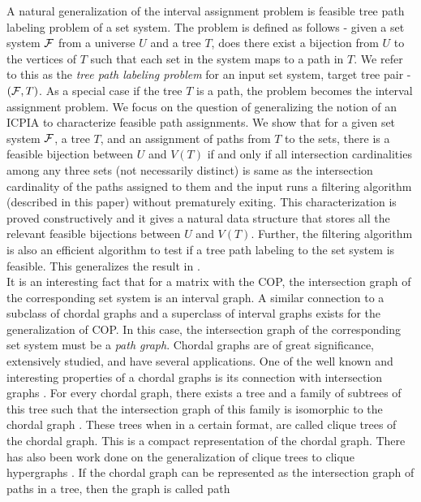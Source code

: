 \documentclass[11pt,letter]{../lib/llncs}
\def\cF{{\cal F}}
\def\xnoindent{\noindent} %
\begin{document}
  A natural generalization of the interval
assignment problem is feasible tree path labeling problem of a set
system. The problem is defined as follows - given a set system $\cF$
from a universe $U$ and a tree $T$, does there exist a bijection from
$U$ to the vertices of $T$ such that each set in the system maps to a
path in $T$.  We refer to this as the {\em tree path labeling problem}
for an input set system, target tree pair - $(\cF,T)$. As a special
case if the tree $T$ is a path, the problem becomes the interval
assignment problem.  We focus on the question of generalizing the
notion of an ICPIA \cite{nsnrs09} to characterize feasible path
assignments.  We show that for a given set system $\cF$, a tree $T$,
and an assignment of paths from $T$ to the sets, there is a feasible
bijection between $U$ and $V(T)$ if and only if all intersection
cardinalities among any three sets (not necessarily distinct) is same
as the intersection cardinality of the paths assigned to them and the
input runs a filtering algorithm (described in this paper) without
prematurely exiting.  This characterization is proved constructively
and it gives a natural data structure that stores all the relevant
feasible bijections between $U$ and $V(T)$.  Further, the filtering
algorithm is also an efficient algorithm to test if a tree path
labeling to the set system is feasible.  This
generalizes the result in \cite{nsnrs09}.\\
\xnoindent It is an interesting fact that for a matrix with the COP,
the intersection graph of the corresponding set system is an interval
graph.  A similar connection to a subclass of chordal graphs and a
superclass of interval graphs exists for the generalization of COP.
In this case, the intersection graph of the corresponding set system
must be a {\em path graph}. Chordal graphs are of great significance,
extensively studied, and have several applications.  One of the well
known and interesting properties of a chordal graphs is its connection
with intersection graphs \cite{mcg04}. For every chordal graph, there
exists a tree and a family of subtrees of this tree such that the
intersection graph of this family is isomorphic to the chordal graph
\cite{plr70,gav78,bp93}.  These trees when in a certain format, are
called clique trees \cite{apy92} of the chordal graph. This is a
compact representation of the chordal graph. There has also been work
done on the generalization of clique trees to clique hypergraphs
\cite{km02}.  If the chordal graph can be represented as the
intersection graph of paths in a tree, then the graph is called path
\end{document}
